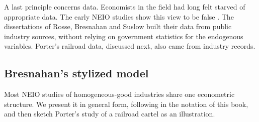A last principle concerns data. Economists in the field had long felt starved of appropriate data. The early NEIO
studies show this view to be false \citep[p.~1025]{Bresnahan1989}. The dissertations of Rosse, Bresnahan and Suslow
built their data from public industry sources, without relying on government statistics for the endogenous variables.
Porter's railroad data, discussed next, also came from industry records.

\subsection{Bresnahan's stylized model}\label{sec:01-stylized-model}

Most NEIO studies of homogeneous-good industries share one econometric structure. We present it in general form,
following \citet[Section~2.1]{Bresnahan1989} in the notation of this book, and then sketch Porter's study of a
railroad cartel as an illustration.

